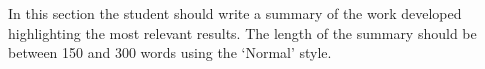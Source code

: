 \begin{summary}

In this section the student should write a summary of the work developed highlighting the most relevant results. The length of the summary should be between 150 and 300 words using the ‘Normal’ style.

\end{summary}